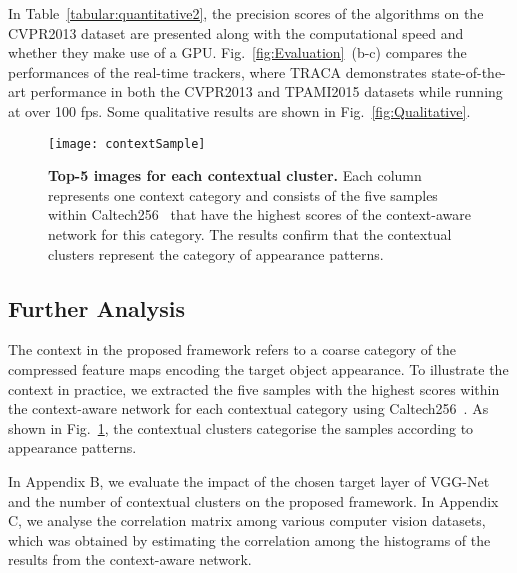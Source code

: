 \documentclass[10pt,twocolumn,letterpaper]{article}
\begin{document}
In Table~\ref{tabular:quantitative2}, the precision scores of the algorithms on the CVPR2013 dataset are presented along with the computational speed and whether they make use of a GPU.
\mbox{Fig.~\ref{fig:Evaluation}~(b-c)} compares the performances of the real-time trackers, where \ac{TRACA} demonstrates state-of-the-art performance in both the CVPR2013 and TPAMI2015 datasets while running at over 100 fps.
Some qualitative results are shown in Fig.~\ref{fig:Qualitative}.

\begin{figure}[t]
    \centering
\texttt{[image: contextSample]}
	\caption{\textbf{Top-5 images for each contextual cluster.} Each column represents one context category and consists of the five samples within Caltech256~\cite{ref:caltech2} that have the highest scores of the context-aware network for this category. The results confirm that the contextual clusters represent the category of appearance patterns.}
	\label{fig:contextClutering}
    \vspace{-5mm}
\end{figure}

\subsection{Further Analysis}
The context in the proposed framework refers to a coarse category of the compressed feature maps encoding the target object appearance.
To illustrate the context in practice, we extracted the five samples with the highest scores within the context-aware network for each contextual category using Caltech256~\cite{ref:caltech2}.
As shown in Fig.~\ref{fig:contextClutering}, the contextual clusters categorise the samples according to appearance patterns.


In Appendix B, we evaluate the impact of the chosen target layer of VGG-Net and the number of contextual clusters on the proposed framework.
In Appendix C, we analyse the correlation matrix among various computer vision datasets, which was obtained by estimating the correlation among the histograms of the results from the context-aware network.






 \vspace{-2mm}
\end{document}

